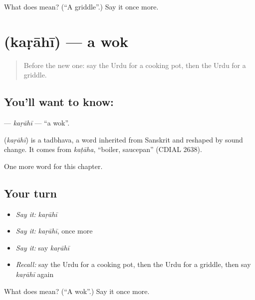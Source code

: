 \begin{tcolorbox}[breakable,colback=teal!4,colframe=teal!35!black,title={Before you move on}]
What does  mean? (\textquotedblleft{}A griddle\textquotedblright{}.) Say it once more.
\end{tcolorbox}
\section[\texorpdfstring{\ur{کڑاہی} (kaṛāhī)}{کڑاہی (kaṛāhī)}]{ (kaṛāhī) — a wok}

\label{lesson:UR-C250-karahi}



\begin{quote}
Before the new one: say the Urdu for a cooking pot, then the Urdu for a griddle.
\end{quote}

\subsection*{You'll want to know: }
\textbf{} — \emph{kaṛāhī} — \textquotedblleft{}a wok\textquotedblright{}.

\begin{cousinweb}
\textbf{} (\emph{kaṛāhī}) is a tadbhava, a word inherited from Sanskrit and reshaped by sound change. It comes from \emph{kaṭāha}, \textquotedblleft{}boiler, saucepan\textquotedblright{} (CDIAL 2638).
\end{cousinweb}

\begin{grammarlens}[title={What you've built}]
One more word for this chapter.
\end{grammarlens}

\subsection*{Your turn}
\begin{itemize}
\raggedright
  \item \emph{Say it:} \emph{kaṛāhī}
  \item \emph{Say it:} \emph{kaṛāhī}, once more
  \item \emph{Say it:} say \emph{kaṛāhī}
  \item \emph{Recall:} say the Urdu for a cooking pot, then the Urdu for a griddle, then say \emph{kaṛāhī} again
\end{itemize}

\begin{tcolorbox}[breakable,colback=teal!4,colframe=teal!35!black,title={Before you move on}]
What does  mean? (\textquotedblleft{}A wok\textquotedblright{}.) Say it once more.
\end{tcolorbox}

